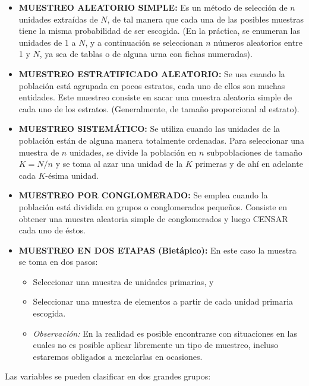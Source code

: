 \begin{itemize}
    \item \textbf{MUESTREO ALEATORIO SIMPLE:} Es un m\'etodo de selecci\'on de $n$ unidades extra\'idas de $N$, de tal manera que cada una de las posibles muestras tiene la misma probabilidad de ser escogida. (En la pr\'actica, se enumeran las unidades de 1 a $N$, y a continuaci\'on se seleccionan $n$ n\'umeros aleatorios entre 1 y $N$, ya sea de tablas o de alguna urna con fichas numeradas).
    \item \textbf{MUESTREO ESTRATIFICADO ALEATORIO:} Se usa cuando la poblaci\'on est\'a agrupada en pocos estratos, cada uno de ellos son muchas entidades. Este muestreo consiste en sacar una muestra aleatoria simple de cada uno de los estratos. (Generalmente, de tama\~no proporcional al estrato).
    \item \textbf{MUESTREO SISTEM\'ATICO:} Se utiliza cuando las unidades de la poblaci\'on est\'an de alguna manera totalmente ordenadas. Para seleccionar una muestra de $n$ unidades, se divide la poblaci\'on en $n$ subpoblaciones de tama\~no $K = N/n$ y se toma al azar una unidad de la $K$ primeras y de ah\'i en adelante cada $K$-\'esima unidad.
    \item \textbf{MUESTREO POR CONGLOMERADO:} Se emplea cuando la poblaci\'on est\'a dividida en grupos o conglomerados peque\~nos. Consiste en obtener una muestra aleatoria simple de conglomerados y luego CENSAR cada uno de \'estos.
    \item \textbf{MUESTREO EN DOS ETAPAS (Biet\'apico):} En este caso la muestra se toma en dos pasos:
    \begin{itemize}
        \item Seleccionar una muestra de unidades primarias, y 
        \item Seleccionar una muestra de elementos a partir de cada unidad primaria escogida.
        \item \textit{Observaci\'on:} En la realidad es posible encontrarse con situaciones en las cuales no es posible aplicar libremente un tipo de muestreo, incluso estaremos obligados a mezclarlas en ocasiones.
    \end{itemize}
\end{itemize}

Las variables se pueden clasificar en dos grandes grupos:

